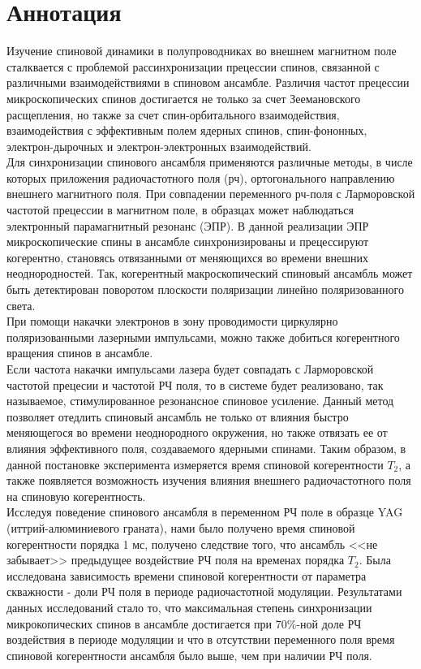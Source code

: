 \documentclass[a4paper,12pt]{article}
\begin{document}
\section{Аннотация}
\large{
Изучение спиновой динамики в полупроводниках во внешнем магнитном поле сталквается с проблемой рассинхронизации прецессии спинов, связанной с различными взаимодействиями в спиновом ансамбле. Различия частот прецессии микроскопических спинов достигается не только за счет Зеемановского расщепления, но также за счет спин-орбитального взаимодействия, взаимодействия с эффективным полем ядерных спинов, спин-фононных, электрон-дырочных и электрон-электронных взаимодействий. \\
Для синхронизации спинового ансамбля применяются различные методы, в числе которых приложения радиочастотного поля (рч), ортогонального направлению внешнего магнитного поля. При совпадении переменного рч-поля с Ларморовской частотой прецессии в магнитном поле, в образцах может наблюдаться электронный парамагнитный резонанс (ЭПР). В данной реализации ЭПР микроскопические спины в ансамбле синхронизированы и прецессируют когерентно, становясь отвязанными от меняющихся во времени внешних неоднородностей. Так, когерентный макроскопический спиновый ансамбль может быть детектирован поворотом плоскости поляризации линейно поляризованного света.\\
При помощи накачки электронов в зону проводимости циркулярно поляризованными лазерными импульсами, можно также добиться когерентного вращения спинов в ансамбле. \\
Если частота накачки импульсами лазера будет совпадать с Ларморовской частотой прецесии и частотой РЧ поля, то в системе будет реализовано, так называемое, стимулированное резонансное спиновое усиление. Данный метод позволяет отедлить спиновый ансамбль не только от влияния быстро меняющегося во времени неоднородного окружения, но также отвязать ее от влияния эффективного поля, создаваемого ядерными спинами. Таким образом, в данной постановке эксперимента измеряется время спиновой когерентности $T_2$, а также появляется возможность изучения влияния внешнего радиочастотного поля на спиновую когерентность.\\
Исследуя поведение спинового ансамбля в переменном РЧ поле в образце YAG (иттрий-алюминиевого граната), нами было получено время спиновой когерентности порядка 1 мс, получено следствие того, что ансамбль <<не забывает>> предыдущее воздействие РЧ поля на временах порядка $T_2$. Была исследована зависимость времени спиновой когерентности от параметра скважности - доли РЧ поля в периоде радиочастотной модуляции. Результатами данных исследований стало то, что максимальная степень синхронизации микрокопических спинов в ансамбле достигается при 70\%-ной доле РЧ воздействия в периоде модуляции и что в отсутствии переменного поля время спиновой когерентности ансамбля было выше, чем при наличии РЧ поля.}
\newpage
\end{document}
